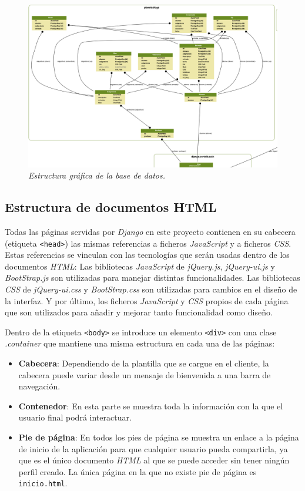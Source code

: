 \documentclass[a4paper, 12pt]{book}
\begin{document}
\begin{figure}
  \centering
  \includegraphics[width=17cm, keepaspectratio]{img/mis_modelos}
  \caption{\textit{Estructura gr\'afica de la base de datos.}}
  \label{fig:disenobbdd}
\end{figure}


\subsection{Estructura de documentos HTML} 
\label{sec:estructurahtml}
Todas las p\'aginas servidas por \textit{Django} en este proyecto contienen en su cabecera (etiqueta \texttt{<head>}) las mismas referencias a ficheros 
\textit{JavaScript} y a ficheros \textit{CSS}. Estas referencias se vinculan con las tecnolog\'ias que ser\'an usadas dentro de los documentos \textit{HTML}:
Las bibliotecas \textit{JavaScript} de \textit{jQuery.js}, \textit{jQuery-ui.js} y \textit{BootStrap.js} son utilizadas para manejar distintas 
funcionalidades. Las bibliotecas \textit{CSS} de \textit{jQuery-ui.css} y \textit{BootStrap.css} son utilizadas para cambios en el dise\~no de la interfaz. 
Y por \'ultimo, los ficheros \textit{JavaScript} y \textit{CSS} propios de cada p\'agina que son utilizados para a\~nadir y mejorar tanto funcionalidad 
como dise\~no.

Dentro de la etiqueta \texttt{<body>} se introduce un elemento \texttt{<div>} con una clase \textit{.container} que mantiene una misma estructura en cada 
una de las p\'aginas:
\begin{itemize}
  \item {\bfseries Cabecera}: Dependiendo de la plantilla que se cargue en el cliente, la cabecera puede variar desde un mensaje de bienvenida a una barra
  de navegaci\'on.
  \item {\bfseries Contenedor}: En esta parte se muestra toda la informaci\'on con la que el usuario final podr\'a interactuar.
  \item {\bfseries Pie de p\'agina}: En todos los pies de p\'agina se muestra un enlace a la p\'agina de inicio de la aplicaci\'on para que cualquier 
  usuario pueda compartirla, ya que es el \'unico documento \textit{HTML} al que se puede acceder sin tener ning\'un perfil creado. La \'unica p\'agina 
  en la que no existe pie de p\'agina es \texttt{inicio.html}.
\end{itemize}
\end{document}
